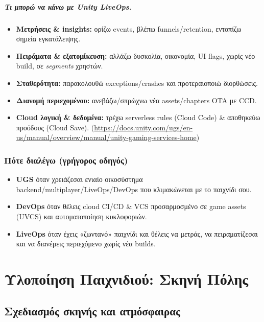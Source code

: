 \paragraph{Τι μπορώ να κάνω με Unity LiveOps.}
\begin{itemize}
  \item \textbf{Μετρήσεις \& insights:} ορίζω events, βλέπω funnels/retention, εντοπίζω σημεία εγκατάλειψης.
  \item \textbf{Πειράματα \& εξατομίκευση:} αλλάζω δυσκολία, οικονομία, UI flags, χωρίς νέο build, σε \emph{segments} χρηστών. 
  \item \textbf{Σταθερότητα:} παρακολουθώ exceptions/crashes και προτεραιοποιώ διορθώσεις. 
  \item \textbf{Διανομή περιεχομένου:} ανεβάζω/σπρώχνω νέα assets/chapters OTA με CCD. 
  \item \textbf{Cloud λογική \& δεδομένα:} τρέχω serverless rules (Cloud Code) \& αποθηκεύω προόδους (Cloud Save). (\href{https://docs.unity.com/ugs/en-us/manual/overview/manual/unity-gaming-services-home}{https://docs.unity.com/ugs/en-us/manual/overview/manual/unity-gaming-services-home})
\end{itemize}

\subsection*{Πότε διαλέγω (γρήγορος οδηγός)}
\begin{itemize}
  \item \textbf{UGS} όταν χρειάζεσαι ενιαίο οικοσύστημα backend/multiplayer/LiveOps/DevOps που κλιμακώνεται με το παιχνίδι σου.
  \item \textbf{DevOps} όταν θέλεις cloud CI/CD \& VCS προσαρμοσμένο σε game assets (UVCS) και αυτοματοποίηση κυκλοφοριών. 
  \item \textbf{LiveOps} όταν έχεις «ζωντανό» παιχνίδι και θέλεις να μετράς, να πειραματίζεσαι και να διανέμεις περιεχόμενο χωρίς νέα builds. 
\end{itemize}

\chapter{Υλοποίηση Παιχνιδιού: Σκηνή Πόλης}
\section{Σχεδιασμός σκηνής και ατμόσφαιρας}

